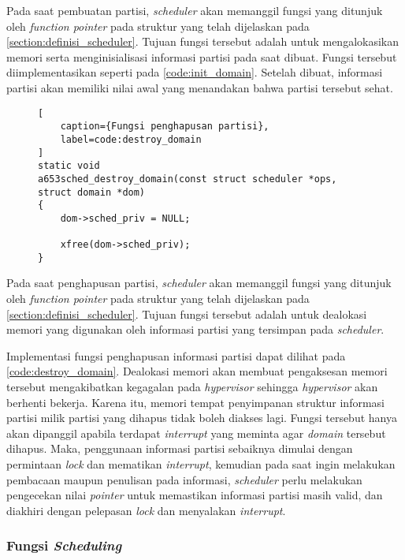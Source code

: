 Pada saat pembuatan partisi, \textit{scheduler} akan memanggil fungsi yang ditunjuk oleh
\textit{function pointer}  pada struktur yang telah dijelaskan pada
\autoref{section:definisi_scheduler}. Tujuan fungsi tersebut adalah untuk mengalokasikan memori
serta menginisialisasi informasi partisi pada saat dibuat. Fungsi tersebut diimplementasikan
seperti pada \autoref{code:init_domain}. Setelah dibuat, informasi partisi akan memiliki nilai
awal yang menandakan bahwa partisi tersebut sehat.


\begin{figure}[!ht]
\begin{lstlisting}[
	caption={Fungsi penghapusan partisi},
	label=code:destroy_domain
]
static void
a653sched_destroy_domain(const struct scheduler *ops, struct domain *dom)
{
    dom->sched_priv = NULL;

    xfree(dom->sched_priv);
}
\end{lstlisting}
\end{figure}

Pada saat penghapusan partisi, \textit{scheduler} akan memanggil fungsi yang ditunjuk oleh
\textit{function pointer}  pada struktur yang telah dijelaskan pada
\autoref{section:definisi_scheduler}. Tujuan fungsi tersebut adalah untuk dealokasi memori yang
digunakan oleh informasi partisi yang tersimpan pada \textit{scheduler}.

Implementasi fungsi penghapusan informasi partisi dapat dilihat pada
\autoref{code:destroy_domain}. Dealokasi memori akan membuat pengaksesan memori tersebut
mengakibatkan kegagalan pada \textit{hypervisor} sehingga \textit{hypervisor} akan berhenti
bekerja. Karena itu, memori tempat penyimpanan struktur informasi partisi milik partisi yang
dihapus tidak boleh diakses lagi. Fungsi tersebut hanya akan dipanggil apabila terdapat
\textit{interrupt} yang meminta agar \textit{domain} tersebut dihapus. Maka, penggunaan
informasi partisi sebaiknya dimulai dengan permintaan \textit{lock} dan mematikan
\textit{interrupt}, kemudian pada saat ingin melakukan pembacaan maupun penulisan pada
informasi, \textit{scheduler} perlu melakukan pengecekan nilai \textit{pointer} untuk memastikan
informasi partisi masih valid, dan diakhiri dengan pelepasan \textit{lock} dan menyalakan
\textit{interrupt}.

\subsubsection{Fungsi \textit{Scheduling}}
\label{section:scheduling_impl}

